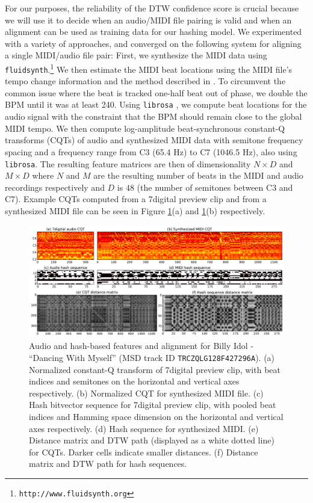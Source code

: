 \documentclass{article}
\begin{document}
For our purposes, the reliability of the DTW confidence score is crucial because we will use it to decide when an audio/MIDI file pairing is valid and when an alignment can be used as training data for our hashing model.
We experimented with a variety of approaches, and converged on the following system for aligning a single MIDI/audio file pair:
First, we synthesize the MIDI data using \texttt{fluidsynth}.\footnote{\texttt{http://www.fluidsynth.org}}
We then estimate the MIDI beat locations using the MIDI file's tempo change information and the method described in \cite{raffel2014pretty_midi}.
To circumvent the common issue where the beat is tracked one-half beat out of phase, we double the BPM until it was at least 240.
Using \texttt{librosa} \cite{mcfee2014librosa}, we compute beat locations for the audio signal with the constraint that the BPM should remain close to the global MIDI tempo. 
We then compute log-amplitude beat-synchronous constant-Q transforms (CQTs) of audio and synthesized MIDI data with semitone frequency spacing and a frequency range from C3 (65.4 Hz) to C7 (1046.5 Hz), also using \texttt{librosa}.
The resulting feature matrices are then of dimensionality $N \times D$ and $M \times D$ where $N$ and $M$ are the resulting number of beats in the MIDI and audio recordings respectively and $D$ is $48$ (the number of semitones between C3 and C7).
Example CQTs computed from a 7digital preview clip and from a synthesized MIDI file can be seen in Figure \ref{fig:simdtw}(a) and \ref{fig:simdtw}(b) respectively.

\begin{figure}
  \includegraphics[width=\textwidth]{sims_and_dtws.pdf}
  \caption{Audio and hash-based features and alignment for Billy Idol - ``Dancing With Myself'' (MSD track ID \texttt{TRCZQLG128F427296A}).
           (a) Normalized constant-Q transform of 7digital preview clip, with beat indices and semitones on the horizontal and vertical axes respectively.
	   (b) Normalized CQT for synthesized MIDI file.
	   (c) Hash bitvector sequence for 7digital preview clip, with pooled beat indices and Hamming space dimension on the horizontal and vertical axes respectively.
	   (d) Hash sequence for synthesized MIDI.
	   (e) Distance matrix and DTW path (displayed as a white dotted line) for CQTs.  Darker cells indicate smaller distances.
	   (f) Distance matrix and DTW path for hash sequences.}
  \label{fig:simdtw}
\end{figure}
\end{document}

